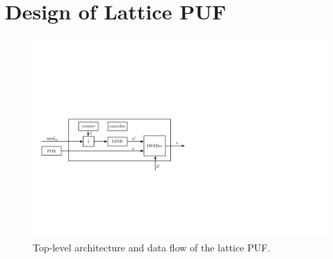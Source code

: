 \section{Design of Lattice PUF}
\label{sec:design}
\begin{figure}[t!]
    \centering
    \includegraphics[width = 1.0\linewidth]{./figs/top_level_arch_redraw.pdf}    \caption{Top-level architecture and data flow of the lattice PUF.}
    \label{fig:fpga_impl}
\end{figure}

